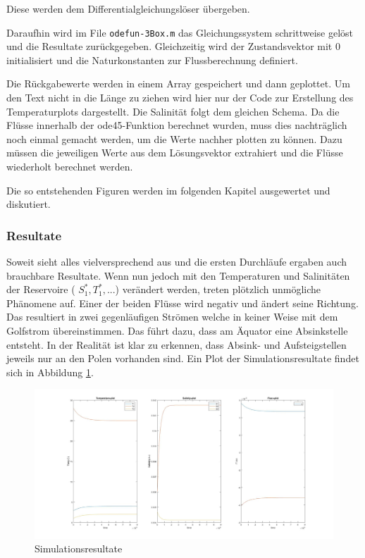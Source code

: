 \label{thermohalin:listing:input}
Diese werden dem Differentialgleichungslöser übergeben.
\label{thermohalin:listing:uebergabe}

Daraufhin wird im File \texttt{odefun-3Box.m} das Gleichungssystem schrittweise gelöst und die Resultate zurückgegeben. Gleichzeitig wird der Zustandsvektor mit $0$ initialisiert und die Naturkonstanten zur Flussberechnung definiert.

\label{thermohalin:listing:solve}

Die Rückgabewerte werden in einem Array gespeichert und dann geplottet. Um den Text nicht in die Länge zu ziehen wird hier nur der Code zur Erstellung des Temperaturplots dargestellt. Die Salinität folgt dem gleichen Schema.
Da die Flüsse innerhalb der ode45-Funktion berechnet wurden, muss dies nachträglich noch einmal gemacht werden, um die Werte nachher plotten zu können. Dazu müssen die jeweiligen Werte aus dem Lösungsvektor extrahiert und die Flüsse wiederholt berechnet werden.
\label{thermohalin:listing:plot}

Die so entstehenden Figuren werden im folgenden Kapitel ausgewertet und diskutiert. 

\subsubsection{Resultate}


Soweit sieht alles vielversprechend aus und die ersten Durchläufe ergaben auch brauchbare Resultate. Wenn nun jedoch mit den Temperaturen und Salinitäten der Reservoire ( $S_1^*, T_1^*,...$) verändert werden, treten plötzlich unmögliche Phänomene auf.
Einer der beiden Flüsse wird negativ und ändert seine Richtung. Das resultiert in zwei gegenläufigen Strömen welche in keiner Weise mit dem Golfstrom übereinstimmen. Das führt dazu, dass am Äquator eine Absinkstelle entsteht. In der Realität ist klar zu erkennen, dass Absink- und Aufsteigstellen jeweils nur an den Polen vorhanden sind. 
Ein Plot der Simulationsresultate findet sich in Abbildung \ref{thermohalin:simulationsresultate}.

\begin{figure}
	\includegraphics[width=14cm]{thermohalin/Code/graphs/result-3b2f-script.jpg}
	\centering
	\caption{Simulationsresultate}
	\label{thermohalin:simulationsresultate}
\end{figure}

